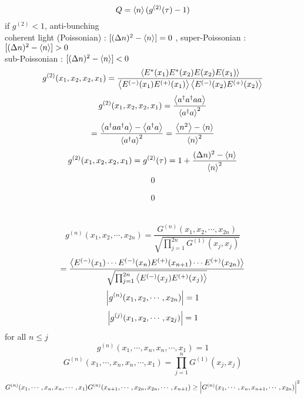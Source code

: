 \documentclass[9pt]{article}
\begin{document}
\begin{equation}
    Q=\ev{n}(g^{(2)}(\tau)-1)
\end{equation}
if $g^{(2)}<1$, anti-bunching \\
coherent light (Poissonian) : $[(\Delta n)^2-\ev{n}]=0$ , super-Poissonian : $[(\Delta n)^2-\ev{n}]>0$ \\
sub-Poissonian : $[(\Delta n)^2-\ev{n}]<0$ 
\\
\begin{equation}
    g^{(2)}(x_1,x_2,x_2,x_1)=\frac{\ev{E^*(x_1)E^*(x_2)E(x_2)E(x_1)}}{\ev{E^{(-)}(x_1)E^{(+)}(x_1)}\ev{E^{(-)}(x_2)E^{(+)}(x_2)}}
\end{equation}
\begin{equation}
    g^{(2)}(x_1,x_2,x_2,x_1)=\frac{\ev{a^\dagger a^\dagger aa}}{\ev{a^\dagger a}^2}
\end{equation}
\begin{equation*}
    =\frac{\ev{a^\dagger a a^\dagger a}-\ev{a^\dagger a}}{\ev{a^\dagger a}^2}
    =\frac{\ev{n^2}-\ev{n}}{\ev{n}^2}
\end{equation*}
\begin{equation}
    g^{(2)}(x_1,x_2,x_2,x_1)=g^{(2)}(\tau)=1+\frac{(\Delta n)^2-\ev{n}}{\ev{n}^2}
\end{equation}
\begin{equation}
    0
\end{equation}
\\
\begin{equation}
    0
\end{equation}
\\
\\
\begin{equation}
    g^{(n)}(x_1,x_2,\cdots,x_{2n})=\frac{G^{(n)}(x_1,x_2,\cdots,x_{2n})}{\sqrt{\prod_{j=1}^{2n} G^{(1)}(x_j,x_j)}}
\end{equation}
\begin{equation*}
    =\frac{\ev{E^{(-)}(x_1)\cdots E^{(-)}(x_n)E^{(+)}(x_{n+1})\cdots E^{(+)}(x_{2n})}}
    {\sqrt{\prod_{j=1}^{2n} \ev{E^{(-)}(x_j)E^{(+)}(x_j)}}}
\end{equation*}
\begin{equation}
    \abs{g^{(n)}(x_1,x_2,\cdots,x_{2n})}=1
\end{equation}
\begin{equation}
    \abs{g^{(j)}(x_1,x_2,\cdots,x_{2j})}=1
\end{equation}
for all $ n \leq j $
\begin{equation}
    g^{(n)}(x_1,\cdots,x_n,x_n,\cdots,x_1)=1
\end{equation}
\begin{equation}
    G^{(n)}(x_1,\cdots,x_n,x_n,\cdots,x_1)=\prod_{j=1}^n G^{(1)}(x_j,x_j)
\end{equation}
\begin{equation*}
    G^{(n)}(x_1,\cdots,x_n,x_n,\cdots,x_1)G^{(n)}(x_{n+1},\cdots,x_{2n},x_{2n},\cdots,x_{n+1}) \geq \abs{G^{(n)}(x_1,\cdots,x_n,x_{n+1},\cdots,x_{2n})}^2
\end{equation*}
\end{document}
